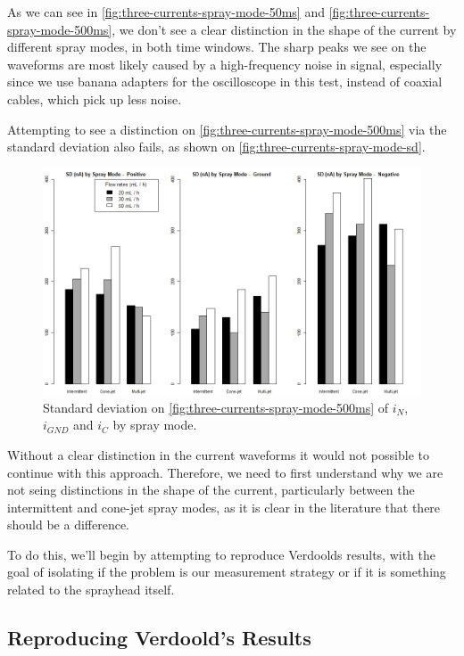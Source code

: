 \documentclass[oneside,12pt]{article}
\begin{document}
As we can see in \autoref{fig:three-currents-spray-mode-50ms} and \autoref{fig:three-currents-spray-mode-500ms}, 
we don't see a clear distinction in the shape of the current 
by different spray modes, in both time windows. The sharp peaks we see on the waveforms are most likely caused
by a high-frequency noise in signal, especially since we use banana adapters for the oscilloscope in this test, instead
of coaxial cables, which pick up less noise.

Attempting to see a distinction on \autoref{fig:three-currents-spray-mode-500ms} via the standard deviation also
fails, as shown on \autoref{fig:three-currents-spray-mode-sd}.

\begin{figure}[h!]
    \centering
    \includegraphics[width=1\textwidth,trim=1 1 1 1,clip]{figures/three-currents-spray-mode-sd.png}
    \caption{Standard deviation on \autoref{fig:three-currents-spray-mode-500ms} of $i_N$, $i_{GND}$ and $i_C$
    by spray mode.}
    \label{fig:three-currents-spray-mode-sd}
\end{figure}

Without a clear distinction in the current waveforms it would not possible to continue with this approach.
Therefore, we need to first understand why we are not seing distinctions in the shape 
of the current, particularly between the intermittent and cone-jet spray modes, as it is clear in the 
literature that there should be a difference.

To do this, we'll begin by attempting to reproduce Verdoolds results, with the goal of isolating 
if the problem is our measurement strategy or if it is something related to the sprayhead itself.

\subsection{Reproducing Verdoold's Results}
\end{document}
